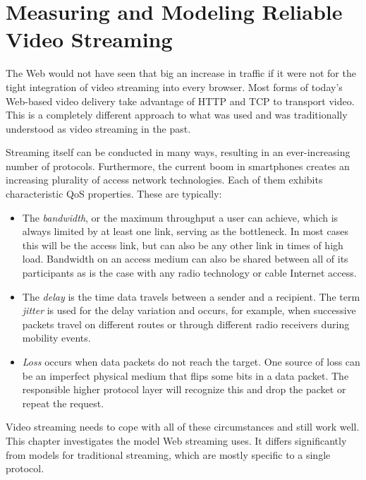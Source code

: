 \chapter{Measuring and Modeling Reliable Video Streaming}
\label{chap:streaming}

The Web would not have seen that big an increase in traffic if it were not for the tight integration of video streaming into every browser. Most forms of today's Web-based video delivery take advantage of \gls{HTTP} and \gls{TCP} to transport video. This is a completely different approach to what was used and was traditionally understood as video streaming in the past.

Streaming itself can be conducted in many ways, resulting in an ever-increasing number of protocols. Furthermore, the current boom in smartphones creates an increasing plurality of access network technologies. Each of them exhibits characteristic \gls{QoS} properties. These are typically:

\begin{itemize}
	\item The \textit{bandwidth}, or the maximum throughput a user can achieve, which is always limited by at least one link, serving as the bottleneck. In most cases this will be the access link, but can also be any other link in times of high load. Bandwidth on an access medium can also be shared between all of its participants as is the case with any radio technology or cable Internet access.

	\item The \textit{delay} is the time data travels between a sender and a recipient. The term \textit{jitter} is used  for the delay variation and occurs, for example, when successive packets travel on different routes or through different radio receivers during mobility events.

	\item \textit{Loss} occurs when data packets do not reach the target. One source of loss can be an imperfect physical medium that flips some bits in a data packet. The responsible higher protocol layer will recognize this and drop the packet or repeat the request.
\end{itemize}

Video streaming needs to cope with all of these circumstances and still work well. This chapter investigates the model Web streaming uses. It differs significantly from models for traditional streaming, which are mostly specific to a single protocol.

